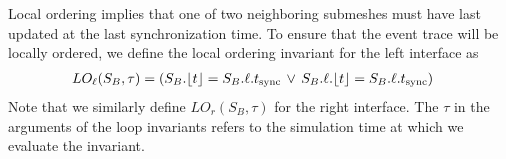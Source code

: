 Local ordering implies that one of two neighboring submeshes must have last updated at the last synchronization time.  To ensure that the event trace will be locally ordered, we define the local ordering invariant for the left interface as
\begin{align}
LO_{\ell}(S_B,\tau) &= (S_B.\lfloor t \rfloor = S_B.\ell.t_{\text{sync}}\,\lor\,S_B.\ell.\lfloor t \rfloor = S_B.\ell.t_{\text{sync}}) \label{eq:LO1}
\end{align}
Note that we similarly define $LO_r(S_B,\tau)$ for the right interface. The $\tau$ in the arguments of the loop invariants refers to the simulation time at which we evaluate the invariant.

